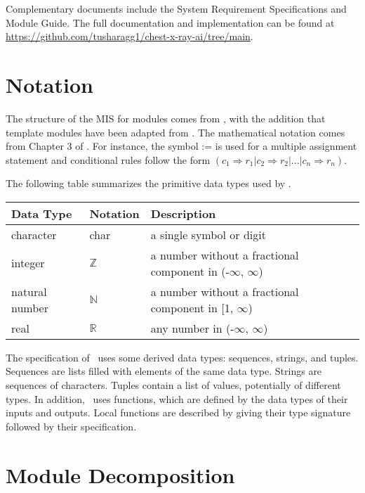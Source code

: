 \documentclass[12pt, titlepage]{article}
\begin{document}
Complementary documents include the System Requirement Specifications and
Module Guide. The full documentation and implementation can be found at
\url{https://github.com/tusharagg1/chest-x-ray-ai/tree/main}.

\section{Notation}

The structure of the MIS for modules comes from \citet{HoffmanAndStrooper1995},
with the addition that template modules have been adapted from
\cite{GhezziEtAl2003}.  The mathematical notation comes from Chapter 3 of
\citet{HoffmanAndStrooper1995}.  For instance, the symbol := is used for a
multiple assignment statement and conditional rules follow the form $(c_1
\Rightarrow r_1 | c_2 \Rightarrow r_2 | ... | c_n \Rightarrow r_n )$.

The following table summarizes the primitive data types used by \progname. 

\begin{center}
\renewcommand{\arraystretch}{1.2}
\noindent 
\begin{tabular}{l l p{7.5cm}} 
\toprule 
\textbf{Data Type} & \textbf{Notation} & \textbf{Description}\\ 
\midrule
character & char & a single symbol or digit\\
integer & $\mathbb{Z}$ & a number without a fractional component in (-$\infty$, $\infty$) \\
natural number & $\mathbb{N}$ & a number without a fractional component in [1, $\infty$) \\
real & $\mathbb{R}$ & any number in (-$\infty$, $\infty$)\\
\bottomrule
\end{tabular} 
\end{center}

\noindent
The specification of \progname \ uses some derived data types: sequences, strings, and
tuples. Sequences are lists filled with elements of the same data type. Strings
are sequences of characters. Tuples contain a list of values, potentially of
different types. In addition, \progname \ uses functions, which
are defined by the data types of their inputs and outputs. Local functions are
described by giving their type signature followed by their specification.

\section{Module Decomposition}
\end{document}
